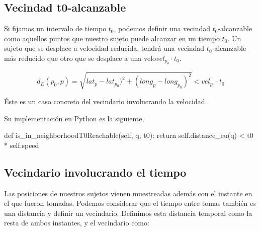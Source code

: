 \documentclass[a4paper, 12pt]{article}
\begin{document}
%
%
%
%
%
%

\subsection{Vecindad t0-alcanzable}

Si fijamos un intervalo de tiempo $t_0$, podemos definir una vecindad $t_0$-alcanzable como aquellos puntos que nuestro sujeto puede alcanzar en un tiempo $t_0$. Un sujeto que se desplace a velocidad reducida, tendr\'a una vecindad $t_0$-alcanzable m\'as reducido  que otro que se desplace a una velo$vel_{p_0}\cdot t_0$. 

$$ d_E(p_0, p) = \sqrt{lat_{p} - lat_{p_0})^2 + (long_{p} - long_{p_0})^2 } < vel_{p_0} \cdot t_0 $$

\'Este es un caso concreto del vecindario involucrando la velocidad. 


Su implementaci\'on en Python es la siguiente,

\begin{python}
        def is_in_neighborhoodT0Reachable(self, q, t0):
                return self.distance_eu(q) < t0 * self.speed
\end{python}

\subsection{Vecindario involucrando el tiempo}

Las posiciones de nuestros sujetos vienen muestreadas adem\'as con el instante en el que fueron tomadas. Podemos considerar que el tiempo entre tomas tambi\'en es una distancia y definir un vecindario. Definimos esta distancia temporal como la resta de ambos instantes, y el vecindario como:
\end{document}
